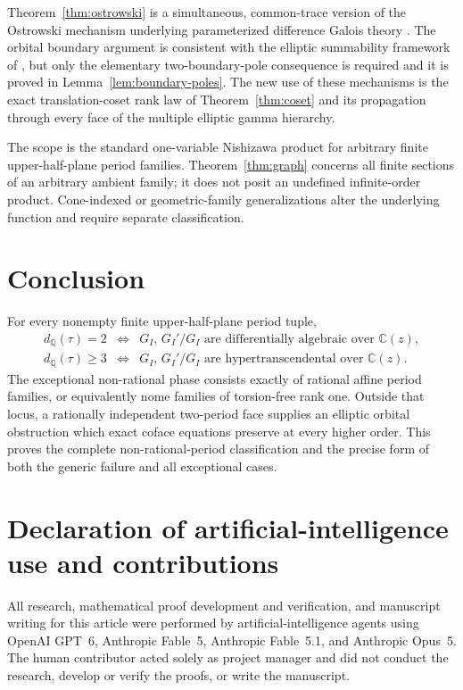 \documentclass[11pt]{article}
\numberwithin{equation}{section}
\theoremstyle{definition}
\theoremstyle{remark}
\newcommand{\C}{\mathbb C}
\newcommand{\Q}{\mathbb Q}
\begin{document}
Theorem~\ref{thm:ostrowski} is a simultaneous, common-trace version of the
Ostrowski mechanism underlying parameterized difference Galois theory
\cite{HardouinSinger2008}.  The orbital boundary argument is consistent with
the elliptic summability framework of
\cite{DreyfusHardouinRoquesSinger2018,ArrecheBabbitt2025}, but only the
elementary two-boundary-pole consequence is required and it is proved in
Lemma~\ref{lem:boundary-poles}.  The new use of these mechanisms is the exact
translation-coset rank law of Theorem~\ref{thm:coset} and its propagation
through every face of the multiple elliptic gamma hierarchy.

The scope is the standard one-variable Nishizawa product for arbitrary
finite upper-half-plane period families.  Theorem~\ref{thm:graph} concerns
all finite sections of an arbitrary ambient family; it does not posit an
undefined infinite-order product.  Cone-indexed or geometric-family
generalizations alter the underlying function and require separate
classification.

\section{Conclusion}

For every nonempty finite upper-half-plane period tuple,
\[
 \boxed{
 \begin{array}{ccl}
 d_\Q(\tau)=2
 &\Longleftrightarrow&
 G_I,\,G_I'/G_I\text{ are differentially algebraic over }\C(z),\\[2mm]
 d_\Q(\tau)\geq3
 &\Longleftrightarrow&
 G_I,\,G_I'/G_I\text{ are hypertranscendental over }\C(z).
 \end{array}}
\]
The exceptional non-rational phase consists exactly of rational affine
period families, or equivalently nome families of torsion-free rank one.
Outside that locus, a rationally independent two-period face supplies an
elliptic orbital obstruction which exact coface equations preserve at every
higher order.  This proves the complete non-rational-period classification
and the precise form of both the generic failure and all exceptional cases.

\section*{Declaration of artificial-intelligence use and contributions}

All research, mathematical proof development and verification, and manuscript
writing for this article were performed by artificial-intelligence agents using
OpenAI GPT~6, Anthropic Fable~5, Anthropic Fable~5.1, and Anthropic Opus~5.  The human
contributor acted solely as project manager and did not conduct the research,
develop or verify the proofs, or write the manuscript.
\end{document}
